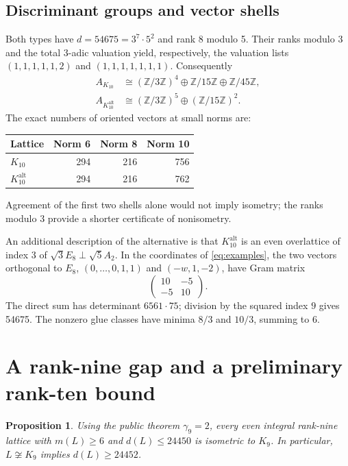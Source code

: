\documentclass[11pt,a4paper]{article}
\newtheorem{proposition}[theorem]{Proposition}
\theoremstyle{remark}\newtheorem{remark}[theorem]{Remark}
\newcommand{\Z}{\mathbb Z}\newcommand{\R}{\mathbb R}\newcommand{\F}{\mathbb F}
\newcommand{\Kalt}{K_{10}^{\mathrm{alt}}}
\begin{document}
\subsection{Discriminant groups and vector shells}

Both types have $d=54675=3^7\cdot5^2$ and rank 8 modulo 5. Their ranks modulo 3 and the total $3$-adic valuation yield, respectively, the valuation lists $(1,1,1,1,1,2)$ and $(1,1,1,1,1,1,1)$. Consequently
\begin{align*}
A_{K_{10}}&\cong(\Z/3\Z)^4\oplus\Z/15\Z\oplus\Z/45\Z,\\
A_{\Kalt}&\cong(\Z/3\Z)^5\oplus(\Z/15\Z)^2.
\end{align*}
The exact numbers of oriented vectors at small norms are:
\begin{center}
\begin{tabular}{lrrr}
\toprule
Lattice &Norm 6&Norm 8&Norm 10\\\midrule
$K_{10}$&294&216&756\\
$\Kalt$&294&216&762\\
\bottomrule
\end{tabular}
\end{center}
Agreement of the first two shells alone would not imply isometry; the ranks modulo 3 provide a shorter certificate of nonisometry.

An additional description of the alternative is that $\Kalt$ is an even overlattice of index 3 of $\sqrt3E_8\perp\sqrt5A_2$. In the coordinates of \eqref{eq:examples}, the two vectors orthogonal to $E_8$, $(0,\ldots,0,1,1)$ and $(-w,1,-2)$, have Gram matrix
\[
\begin{pmatrix}10&-5\\-5&10\end{pmatrix}.
\]
The direct sum has determinant $6561\cdot75$; division by the squared index $9$ gives 54675. The nonzero glue classes have minima $8/3$ and $10/3$, summing to 6.

\section{A rank-nine gap and a preliminary rank-ten bound}

\begin{proposition}\label{prop:gap}
Using the public theorem $\gamma_9=2$, every even integral rank-nine lattice with $m(L)\ge6$ and $d(L)\le24450$ is isometric to $K_9$. In particular, $L\not\cong K_9$ implies $d(L)\ge24452$.
\end{proposition}
\end{document}
